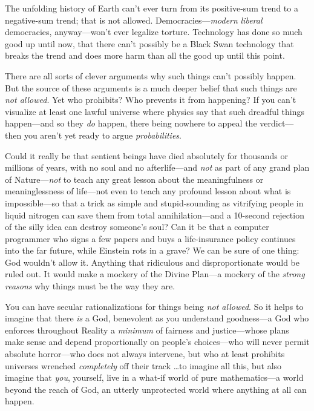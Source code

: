 {
 The unfolding history of Earth can't ever turn
from its positive-sum trend to a negative-sum trend; that is not
allowed. Democracies---\textit{modern} \textit{liberal} democracies,
anyway---won't ever legalize torture. Technology has
done so much good up until now, that there can't
possibly be a Black Swan technology that breaks the trend and does more
harm than all the good up until this point.}

{
 There are all sorts of clever arguments why such things
can't possibly happen. But the source of these
arguments is a much deeper belief that such things are \textit{not
allowed}. Yet who prohibits? Who prevents it from happening? If you
can't visualize at least one lawful universe where
physics say that such dreadful things happen---and so they \textit{do}
happen, there being nowhere to appeal the verdict---then you
aren't yet ready to argue \textit{probabilities}.}

{
 Could it really be that sentient beings have died absolutely for
thousands or millions of years, with no soul and no afterlife---and
\textit{not} as part of any grand plan of Nature---\textit{not} to
teach any great lesson about the meaningfulness or meaninglessness of
life---not even to teach any profound lesson about what is
impossible---so that a trick as simple and stupid-sounding as
vitrifying people in liquid nitrogen can save them from total
annihilation---and a 10-second rejection of the silly idea can destroy
someone's soul? Can it be that a computer programmer
who signs a few papers and buys a life-insurance policy continues into
the far future, while Einstein rots in a grave? We can be sure of one
thing: God wouldn't allow it. Anything that ridiculous
and disproportionate would be ruled out. It would make a mockery of the
Divine Plan---a mockery of the \textit{strong reasons} why things must
be the way they are.}

{
 You can have secular rationalizations for things being \textit{not
allowed}. So it helps to imagine that there \textit{is} a God,
benevolent as you understand goodness---a God who enforces throughout
Reality a \textit{minimum} of fairness and justice---whose plans make
sense and depend proportionally on people's
choices---who will never permit absolute horror---who does not always
intervene, but who at least prohibits universes wrenched
\textit{completely} off their track \ldots to imagine all this, but also
imagine that \textit{you}, yourself, live in a what-if world of pure
mathematics---a world beyond the reach of God, an utterly unprotected
world where anything at all can happen.}

